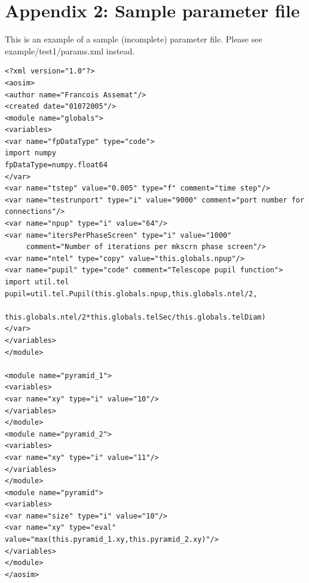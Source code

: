 \documentclass{article}
\begin{document}
\section*{Appendix 2: Sample parameter file}
\label{app:paramfile}
This is an example of a sample (incomplete) parameter file.  Please
see example/test1/params.xml instead.

\begin{verbatim}
<?xml version="1.0"?>
<aosim>
<author name="Francois Assemat"/>
<created date="01072005"/>
<module name="globals">
<variables>
<var name="fpDataType" type="code">
import numpy
fpDataType=numpy.float64
</var>
<var name="tstep" value="0.005" type="f" comment="time step"/>
<var name="testrunport" type="i" value="9000" comment="port number for
connections"/>
<var name="npup" type="i" value="64"/>
<var name="itersPerPhaseScreen" type="i" value="1000" 
     comment="Number of iterations per mkscrn phase screen"/>
<var name="ntel" type="copy" value="this.globals.npup"/>
<var name="pupil" type="code" comment="Telescope pupil function">
import util.tel
pupil=util.tel.Pupil(this.globals.npup,this.globals.ntel/2,
             this.globals.ntel/2*this.globals.telSec/this.globals.telDiam)
</var>
</variables>
</module>

<module name="pyramid_1">
<variables>
<var name="xy" type="i" value="10"/>
</variables>
</module>
<module name="pyramid_2">
<variables>
<var name="xy" type="i" value="11"/>
</variables>
</module>
<module name="pyramid">
<variables>
<var name="size" type="i" value="10"/>
<var name="xy" type="eval" value="max(this.pyramid_1.xy,this.pyramid_2.xy)"/>
</variables>
</module>
</aosim>
\end{verbatim}

\pagebreak



\printindex
\end{document}
